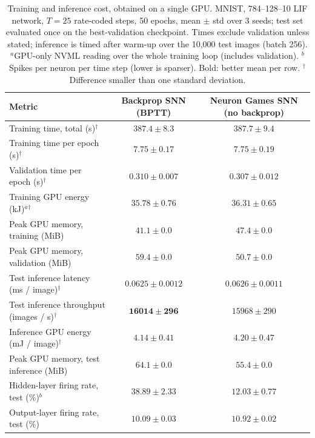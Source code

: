 \begin{table}[t]
\centering
\small
\caption{Training and inference cost, obtained on a single GPU. MNIST, 784--128--10 LIF network, $T=25$ rate-coded steps, 50 epochs, mean $\pm$ std over 3 seeds; test set evaluated once on the best-validation checkpoint. Times exclude validation unless stated; inference is timed after warm-up over the 10{,}000 test images (batch 256). $^a$GPU-only NVML reading over the whole training loop (includes validation). $^b$Spikes per neuron per time step (lower is sparser). Bold: better mean per row. $^\dagger$Difference smaller than one standard deviation.}
\label{tab:ng-cost}
\begin{tabular}{lcc}
\toprule
Metric & Backprop SNN (BPTT) & Neuron Games SNN (no backprop) \\
\midrule
Training time, total (s)$^\dagger$ & $\boldsymbol{387.4 \pm 8.3}$ & $387.7 \pm 9.4$ \\
Training time per epoch (s)$^\dagger$ & $\boldsymbol{7.75 \pm 0.17}$ & $7.75 \pm 0.19$ \\
Validation time per epoch (s)$^\dagger$ & $0.310 \pm 0.007$ & $\boldsymbol{0.307 \pm 0.012}$ \\
Training GPU energy (kJ)$^a$$^\dagger$ & $\boldsymbol{35.78 \pm 0.76}$ & $36.31 \pm 0.65$ \\
Peak GPU memory, training (MiB) & $\boldsymbol{41.1 \pm 0.0}$ & $47.4 \pm 0.0$ \\
Peak GPU memory, validation (MiB) & $59.4 \pm 0.0$ & $\boldsymbol{50.7 \pm 0.0}$ \\
\midrule
Test inference latency (ms / image)$^\dagger$ & $\boldsymbol{0.0625 \pm 0.0012}$ & $0.0626 \pm 0.0011$ \\
Test inference throughput (images / s)$^\dagger$ & $\boldsymbol{16014 \pm 296}$ & $15968 \pm 290$ \\
Inference GPU energy (mJ / image)$^\dagger$ & $\boldsymbol{4.14 \pm 0.41}$ & $4.20 \pm 0.47$ \\
Peak GPU memory, test inference (MiB) & $64.1 \pm 0.0$ & $\boldsymbol{55.4 \pm 0.0}$ \\
\midrule
Hidden-layer firing rate, test (\%)$^b$ & $38.89 \pm 2.33$ & $\boldsymbol{12.03 \pm 0.77}$ \\
Output-layer firing rate, test (\%) & $10.09 \pm 0.03$ & $10.92 \pm 0.02$ \\
\bottomrule
\end{tabular}
\end{table}

